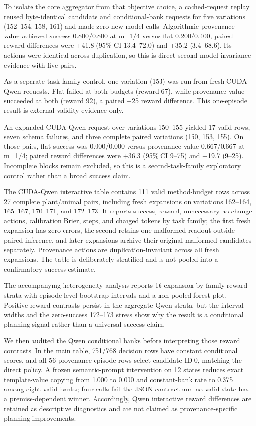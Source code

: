 \documentclass[10pt]{article}
\begin{document}
To isolate the core aggregator from that objective choice, a cached-request replay reused byte-identical candidate and conditional-bank requests for five variations (152--154, 158, 161) and made zero new model calls. Algorithmic provenance-value achieved success 0.800/0.800 at m=1/4 versus flat 0.200/0.400; paired reward differences were +41.8 (95\% CI 13.4--72.0) and +35.2 (3.4--68.6). Its actions were identical across duplication, so this is direct second-model invariance evidence with five pairs.

As a separate task-family control, one \texttt{} variation (153) was run from fresh CUDA Qwen requests. Flat failed at both budgets (reward 67), while provenance-value succeeded at both (reward 92), a paired +25 reward difference. This one-episode result is external-validity evidence only.

An expanded CUDA Qwen \texttt{} request over variations 150--155 yielded 17 valid rows, seven schema failures, and three complete paired variations (150, 153, 155). On those pairs, flat success was 0.000/0.000 versus provenance-value 0.667/0.667 at m=1/4; paired reward differences were +36.3 (95\% CI 9--75) and +19.7 (9--25). Incomplete blocks remain excluded, so this is a second-task-family exploratory control rather than a broad success claim.

The CUDA-Qwen interactive table contains 111 valid method-budget rows across 27 complete plant/animal pairs, including fresh expansions on variations 162--164, 165--167, 170--171, and 172--173. It reports success, reward, unnecessary no-change actions, calibration Brier, steps, and charged tokens by task family; the first fresh expansion has zero errors, the second retains one malformed readout outside paired inference, and later expansions archive their original malformed candidates separately. Provenance actions are duplication-invariant across all fresh expansions. The table is deliberately stratified and is not pooled into a confirmatory success estimate.

The accompanying heterogeneity analysis reports 16 expansion-by-family reward strata with episode-level bootstrap intervals and a non-pooled forest plot. Positive reward contrasts persist in the aggregate Qwen strata, but the interval widths and the zero-success 172--173 stress show why the result is a conditional planning signal rather than a universal success claim.

We then audited the Qwen conditional banks before interpreting those reward contrasts. In the main table, 751/768 decision rows have constant conditional scores, and all 56 provenance episode rows select candidate ID 0, matching the direct policy. A frozen semantic-prompt intervention on 12 states reduces exact template-value copying from 1.000 to 0.000 and constant-bank rate to 0.375 among eight valid banks; four calls fail the JSON contract and no valid state has a premise-dependent winner. Accordingly, Qwen interactive reward differences are retained as descriptive diagnostics and are not claimed as provenance-specific planning improvements.
\end{document}
